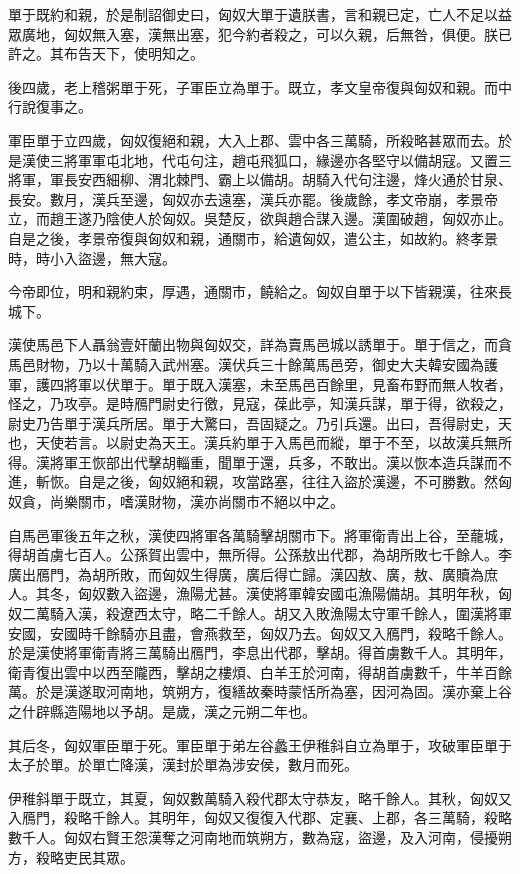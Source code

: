 單于既約和親，於是制詔御史曰，匈奴大單于遺朕書，言和親已定，亡人不足以益眾廣地，匈奴無入塞，漢無出塞，犯今約者殺之，可以久親，后無咎，俱便。朕已許之。其布告天下，使明知之。

後四歲，老上稽粥單于死，子軍臣立為單于。既立，孝文皇帝復與匈奴和親。而中行說復事之。

軍臣單于立四歲，匈奴復絕和親，大入上郡、雲中各三萬騎，所殺略甚眾而去。於是漢使三將軍軍屯北地，代屯句注，趙屯飛狐口，緣邊亦各堅守以備胡寇。又置三將軍，軍長安西細柳、渭北棘門、霸上以備胡。胡騎入代句注邊，烽火通於甘泉、長安。數月，漢兵至邊，匈奴亦去遠塞，漢兵亦罷。後歲餘，孝文帝崩，孝景帝立，而趙王遂乃陰使人於匈奴。吳楚反，欲與趙合謀入邊。漢圍破趙，匈奴亦止。自是之後，孝景帝復與匈奴和親，通關市，給遺匈奴，遣公主，如故約。終孝景時，時小入盜邊，無大寇。

今帝即位，明和親約束，厚遇，通關市，饒給之。匈奴自單于以下皆親漢，往來長城下。

漢使馬邑下人聶翁壹奸蘭出物與匈奴交，詳為賣馬邑城以誘單于。單于信之，而貪馬邑財物，乃以十萬騎入武州塞。漢伏兵三十餘萬馬邑旁，御史大夫韓安國為護軍，護四將軍以伏單于。單于既入漢塞，未至馬邑百餘里，見畜布野而無人牧者，怪之，乃攻亭。是時鴈門尉史行徼，見寇，葆此亭，知漢兵謀，單于得，欲殺之，尉史乃告單于漢兵所居。單于大驚曰，吾固疑之。乃引兵還。出曰，吾得尉史，天也，天使若言。以尉史為天王。漢兵約單于入馬邑而縱，單于不至，以故漢兵無所得。漢將軍王恢部出代擊胡輜重，聞單于還，兵多，不敢出。漢以恢本造兵謀而不進，斬恢。自是之後，匈奴絕和親，攻當路塞，往往入盜於漢邊，不可勝數。然匈奴貪，尚樂關市，嗜漢財物，漢亦尚關市不絕以中之。

自馬邑軍後五年之秋，漢使四將軍各萬騎擊胡關市下。將軍衛青出上谷，至蘢城，得胡首虜七百人。公孫賀出雲中，無所得。公孫敖出代郡，為胡所敗七千餘人。李廣出鴈門，為胡所敗，而匈奴生得廣，廣后得亡歸。漢囚敖、廣，敖、廣贖為庶人。其冬，匈奴數入盜邊，漁陽尤甚。漢使將軍韓安國屯漁陽備胡。其明年秋，匈奴二萬騎入漢，殺遼西太守，略二千餘人。胡又入敗漁陽太守軍千餘人，圍漢將軍安國，安國時千餘騎亦且盡，會燕救至，匈奴乃去。匈奴又入鴈門，殺略千餘人。於是漢使將軍衛青將三萬騎出鴈門，李息出代郡，擊胡。得首虜數千人。其明年，衛青復出雲中以西至隴西，擊胡之樓煩、白羊王於河南，得胡首虜數千，牛羊百餘萬。於是漢遂取河南地，筑朔方，復繕故秦時蒙恬所為塞，因河為固。漢亦棄上谷之什辟縣造陽地以予胡。是歲，漢之元朔二年也。

其后冬，匈奴軍臣單于死。軍臣單于弟左谷蠡王伊稚斜自立為單于，攻破軍臣單于太子於單。於單亡降漢，漢封於單為涉安侯，數月而死。

伊稚斜單于既立，其夏，匈奴數萬騎入殺代郡太守恭友，略千餘人。其秋，匈奴又入鴈門，殺略千餘人。其明年，匈奴又復復入代郡、定襄、上郡，各三萬騎，殺略數千人。匈奴右賢王怨漢奪之河南地而筑朔方，數為寇，盜邊，及入河南，侵擾朔方，殺略吏民其眾。

